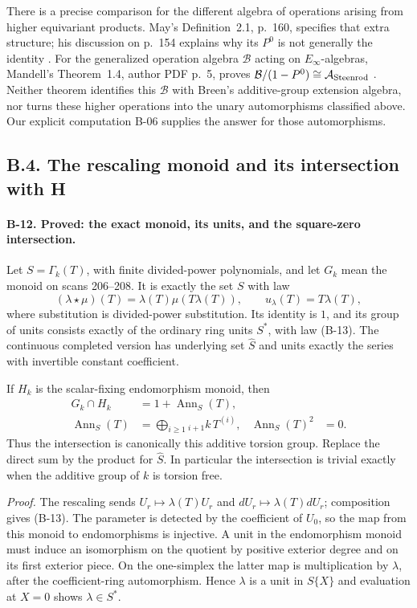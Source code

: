 There is a precise comparison for the different algebra of
operations arising from higher equivariant products. May's
Definition~2.1, p.~160, specifies that extra structure; his
discussion on p.~154 explains why its $P^0$ is not generally the
identity \cite{BMay1970}. For the generalized operation algebra
$\mathcal B$ acting on $E_\infty$-algebras, Mandell's
Theorem~1.4, author PDF p.~5, proves
$\mathcal B/(1-P^0)\cong\mathcal A_{\rm Steenrod}$
\cite{BMandell2001}. Neither theorem identifies this
$\mathcal B$ with Breen's additive-group extension algebra, nor
turns these higher operations into the unary automorphisms
classified above. Our explicit computation B-06 supplies the
answer for those automorphisms.

\subsection{B.4. The rescaling monoid and its intersection with H}

\paragraph{B-12. Proved: the exact monoid, its units, and the
square-zero intersection.}
Let $S=\Gamma_k(T)$, with finite divided-power polynomials, and
let $G_k$ mean the monoid on scans 206--208. It is exactly the set
$S$ with law
\[
 (\lambda\star\mu)(T)=\lambda(T)\mu(T\lambda(T)),
 \qquad u_\lambda(T)=T\lambda(T),
 \tag{B-13}
\]
where substitution is divided-power substitution. Its identity is
$1$, and its group of units consists exactly of the ordinary ring
units $S^*$, with law (B-13). The continuous completed version has
underlying set $\widehat S$ and units exactly the series with
invertible constant coefficient.

If $H_k$ is the scalar-fixing endomorphism monoid, then
\begin{align*}
 G_k\cap H_k
  &=1+\operatorname{Ann}_S(T),\\
 \operatorname{Ann}_S(T)
  &=\bigoplus_{i\geq1}{}_{{i+1}}k\,T^{(i)},
       &\operatorname{Ann}_S(T)^2&=0.
 \tag{B-14}
\end{align*}
Thus the intersection is canonically this additive torsion group.
Replace the direct sum by the product for $\widehat S$. In
particular the intersection is trivial exactly when the additive
group of $k$ is torsion free.

\emph{Proof.}
The rescaling sends $U_r\mapsto\lambda(T)U_r$ and
$dU_r\mapsto\lambda(T)dU_r$; composition gives (B-13).
The parameter is detected by the coefficient of $U_0$, so the map
from this monoid to endomorphisms is injective.
A unit in the endomorphism monoid must induce an isomorphism on
the quotient by positive exterior degree and on its first exterior
piece. On the one-simplex the latter map is multiplication by
$\lambda$, after the coefficient-ring automorphism. Hence
$\lambda$ is a unit in $S\{X\}$ and evaluation at $X=0$ shows
$\lambda\in S^*$.

